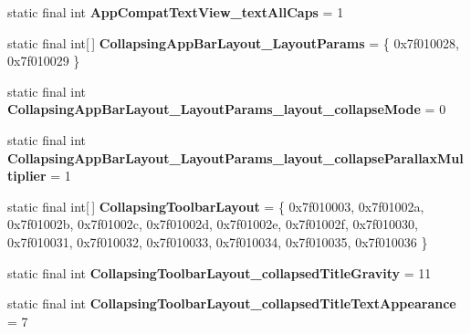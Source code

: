 \begin{DoxyCompactItemize}
\item 
\hypertarget{classandroid_1_1support_1_1design_1_1_r_1_1styleable_a0baa66e50309da6d36b351e27495ab50}{}static final int {\bfseries App\+Compat\+Text\+View\+\_\+text\+All\+Caps} = 1\label{classandroid_1_1support_1_1design_1_1_r_1_1styleable_a0baa66e50309da6d36b351e27495ab50}

\item 
\hypertarget{classandroid_1_1support_1_1design_1_1_r_1_1styleable_a84348eab6e616d953feaef19d531ee2f}{}static final int\mbox{[}$\,$\mbox{]} {\bfseries Collapsing\+App\+Bar\+Layout\+\_\+\+Layout\+Params} = \{ 0x7f010028, 0x7f010029 \}\label{classandroid_1_1support_1_1design_1_1_r_1_1styleable_a84348eab6e616d953feaef19d531ee2f}

\item 
\hypertarget{classandroid_1_1support_1_1design_1_1_r_1_1styleable_a1d5aed1637f9e12e9c7fe8a9be4477ac}{}static final int {\bfseries Collapsing\+App\+Bar\+Layout\+\_\+\+Layout\+Params\+\_\+layout\+\_\+collapse\+Mode} = 0\label{classandroid_1_1support_1_1design_1_1_r_1_1styleable_a1d5aed1637f9e12e9c7fe8a9be4477ac}

\item 
\hypertarget{classandroid_1_1support_1_1design_1_1_r_1_1styleable_affff3563b27043783df87a7deed3b71e}{}static final int {\bfseries Collapsing\+App\+Bar\+Layout\+\_\+\+Layout\+Params\+\_\+layout\+\_\+collapse\+Parallax\+Multiplier} = 1\label{classandroid_1_1support_1_1design_1_1_r_1_1styleable_affff3563b27043783df87a7deed3b71e}

\item 
\hypertarget{classandroid_1_1support_1_1design_1_1_r_1_1styleable_a4a019838b1c3daad84b4ffff397db335}{}static final int\mbox{[}$\,$\mbox{]} {\bfseries Collapsing\+Toolbar\+Layout} = \{ 0x7f010003, 0x7f01002a, 0x7f01002b, 0x7f01002c, 0x7f01002d, 0x7f01002e, 0x7f01002f, 0x7f010030, 0x7f010031, 0x7f010032, 0x7f010033, 0x7f010034, 0x7f010035, 0x7f010036 \}\label{classandroid_1_1support_1_1design_1_1_r_1_1styleable_a4a019838b1c3daad84b4ffff397db335}

\item 
\hypertarget{classandroid_1_1support_1_1design_1_1_r_1_1styleable_ab85cd00fd4e4297fd0e0de46fa282785}{}static final int {\bfseries Collapsing\+Toolbar\+Layout\+\_\+collapsed\+Title\+Gravity} = 11\label{classandroid_1_1support_1_1design_1_1_r_1_1styleable_ab85cd00fd4e4297fd0e0de46fa282785}

\item 
\hypertarget{classandroid_1_1support_1_1design_1_1_r_1_1styleable_ab001e6f6331a614848c62ab802482392}{}static final int {\bfseries Collapsing\+Toolbar\+Layout\+\_\+collapsed\+Title\+Text\+Appearance} = 7\label{classandroid_1_1support_1_1design_1_1_r_1_1styleable_ab001e6f6331a614848c62ab802482392}


\end{DoxyCompactItemize}
